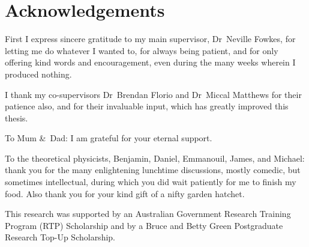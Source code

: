 \chapter{Acknowledgements}
\label{ch:acknowledgements}

First I express sincere gratitude to my main supervisor,
Dr~Neville Fowkes,
for letting me do whatever I wanted to,
for always being patient,
and for only offering kind words and encouragement,
even during the many weeks wherein I produced nothing.

I thank my co-supervisors
Dr~Brendan Florio and Dr~Miccal Matthews
for their patience also,
and for their invaluable input,
which has greatly improved this thesis.

To Mum \&~Dad:
I am grateful for your eternal support.

To the theoretical physicists,
Benjamin, Daniel, Emmanouil, James, and Michael:
thank you for the many enlightening lunchtime discussions,
mostly comedic, but sometimes intellectual,
during which you did wait patiently for me to finish my food.
Also thank you for your kind gift of a nifty garden hatchet.

\thematicbreak

This research was supported
by an Australian Government Research Training Program (RTP) Scholarship
and by a Bruce and Betty Green Postgraduate Research Top-Up Scholarship.
